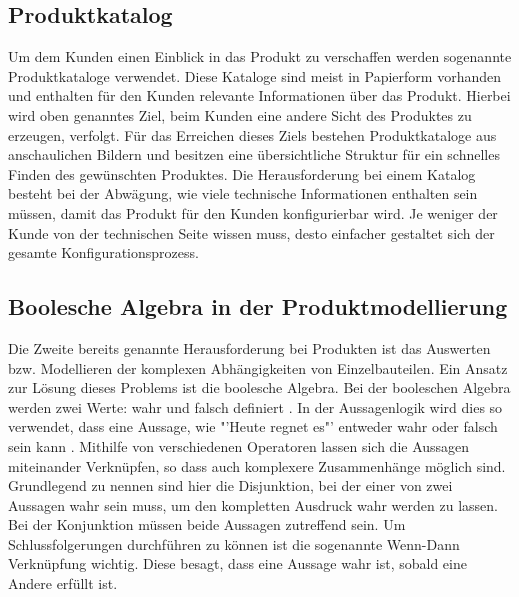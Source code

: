 \subsection{Produktkatalog}
Um dem Kunden einen Einblick in das Produkt zu verschaffen werden sogenannte Produktkataloge verwendet. Diese Kataloge sind meist in Papierform vorhanden und enthalten für den Kunden relevante Informationen über das Produkt.  Hierbei wird oben genanntes Ziel, beim Kunden eine andere Sicht des Produktes zu erzeugen, verfolgt. Für das Erreichen dieses Ziels bestehen Produktkataloge aus anschaulichen Bildern und besitzen eine übersichtliche Struktur für ein schnelles Finden des gewünschten Produktes. Die Herausforderung bei einem Katalog besteht bei der Abwägung, wie viele technische Informationen enthalten sein müssen, damit das Produkt für den Kunden konfigurierbar wird. Je weniger der Kunde von der technischen Seite wissen muss, desto einfacher gestaltet sich der gesamte Konfigurationsprozess.  


\subsection{Boolesche Algebra in der Produktmodellierung}
Die Zweite bereits genannte Herausforderung bei Produkten ist das Auswerten bzw. Modellieren der  komplexen Abhängigkeiten von Einzelbauteilen.  Ein Ansatz zur Lösung dieses Problems ist die boolesche Algebra. Bei der booleschen Algebra werden zwei Werte: wahr und falsch definiert \cite{bib:boolescheAlgebra1}. In der Aussagenlogik wird dies so verwendet, dass eine Aussage, wie "'Heute regnet es"' entweder wahr oder falsch sein kann \cite{bib:boolescheAlgebra2}. Mithilfe von verschiedenen Operatoren lassen sich die Aussagen miteinander Verknüpfen, so dass auch komplexere Zusammenhänge möglich sind. Grundlegend zu nennen sind hier die Disjunktion, bei der einer von zwei Aussagen wahr sein muss, um den kompletten Ausdruck wahr werden zu lassen. Bei der Konjunktion müssen beide Aussagen zutreffend sein. Um Schlussfolgerungen durchführen zu können ist die sogenannte Wenn-Dann Verknüpfung wichtig. Diese besagt, dass eine Aussage wahr ist, sobald eine Andere erfüllt ist.\par

